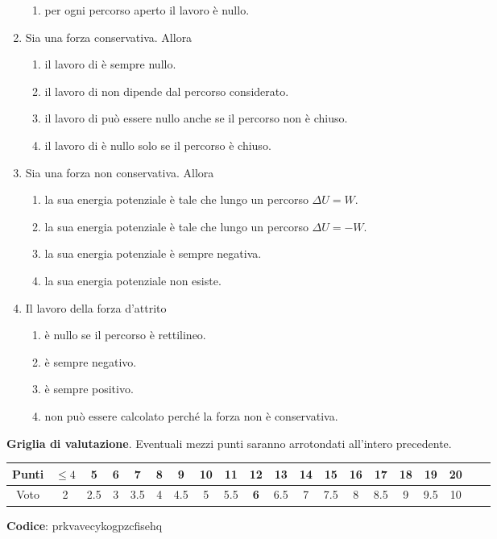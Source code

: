 \documentclass{article}
\begin{document}
\begin{enumerate}
\begin{enumerate}[label=\Alph*.]
    \item per ogni percorso aperto il lavoro è nullo.
  \end{enumerate}
  \item Sia  una forza conservativa. Allora
  \begin{enumerate}[label=\Alph*.]
    \item il lavoro di  è sempre nullo.
    \item il lavoro di  non dipende dal percorso considerato.
    \item il lavoro di  può essere nullo anche se il percorso non è chiuso.
    \item il lavoro di  è nullo solo se il percorso è chiuso.
  \end{enumerate}
  \item Sia  una forza non conservativa. Allora
  \begin{enumerate}[label=\Alph*.]
    \item la sua energia potenziale è tale che lungo un percorso $\Delta U=W$.
    \item la sua energia potenziale è tale che lungo un percorso $\Delta U=-W$.
    \item la sua energia potenziale è sempre negativa.
    \item la sua energia potenziale non esiste.
  \end{enumerate}
  \item Il lavoro della forza d'attrito
  \begin{enumerate}[label=\Alph*.]
    \item è nullo se il percorso è rettilineo.
    \item è sempre negativo.
    \item è sempre positivo.
    \item non può essere calcolato perché la forza non è conservativa.
  \end{enumerate}
\end{enumerate}








\newpage \maketitle \centering \textbf{Griglia di valutazione}. Eventuali mezzi punti saranno arrotondati all'intero precedente. \begin{table}[h]     \centering \begin{tabular}{|c|c|c|c|c|c|c|c|c|c|c|c|c|c|c|c|c|c|c|c|} \hline Punti &  $\leq 4$ & 5 & 6 & 7 & 8 & 9 & 10 & 11 & \textbf{12} & 13 & 14 & 15 & 16 & 17 & 18 & 19 & 20 \\ \hline Voto & 2 & 2.5 & 3 & 3.5 & 4 & 4.5 & 5 & 5.5 & \textbf{6} & 6.5 & 7 & 7.5 & 8 & 8.5 & 9 & 9.5 & 10 \\ \hline \end{tabular} \end{table}
\textbf{Codice}: prkvavecykogpzcfisehq
\end{document}
